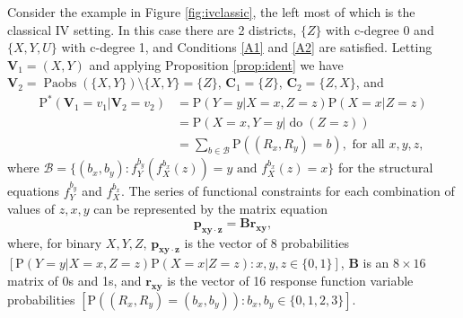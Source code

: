 \documentclass[12pt]{article}
\def\Pr{{\mathrm{P}}}
\def\Pdo{{\mathrm{P}^*}}
\DeclareMathOperator{\Paobs}{Paobs}
\newcommand{\bV}{\boldsymbol{V}}
\DeclareMathOperator{\Do}{do}
\begin{document}
Consider the example in Figure \ref{fig:ivclassic}, the left most of which is the classical IV setting. In this case there are 2 districts, $\{Z\}$ with c-degree 0 and $\{X, Y, U\}$ with c-degree 1, and Conditions \ref{A1} and \ref{A2} are satisfied. Letting $\bV_1 = (X, Y)$ and applying Proposition \ref{prop:ident} we have $\bV_2 = \Paobs(\{X, Y\}) \setminus \{X, Y\} = \{Z\}$, $\boldsymbol{C}_1 = \{Z\}$, $\boldsymbol{C}_2 = \{Z, X\}$, and
\begin{align*}
    \Pdo(\bV_1 = v_{1} |\bV_2 = v_2) &= \Pr(Y = y | X = x, Z = z) \Pr(X = x | Z = z)\\ 
    & = \Pr(X = x, Y = y | \Do(Z = z)) \\
    & = \sum_{b \in \mathcal{B}} \Pr((R_x, R_y) = b), \mbox{ for all } x, y, z,
\end{align*}
where $\mathcal{B} = \{(b_x, b_y): f^{b_y}_Y(f^{b_x}_X(z)) = y \mbox{ and } f^{b_x}_X(z) = x\}$ for the structural equations $f^{b_y}_Y$ and $f^{b_x}_X$. The series of functional constraints for each combination of values of $z, x, y$ can be represented by the matrix equation
\[
\boldsymbol{p_{xy\cdot z}} = \boldsymbol{B} \boldsymbol{r_{xy}}, 
\]
where, for binary $X, Y, Z$, $\boldsymbol{p_{xy\cdot z}}$ is the vector of 8 probabilities $[\Pr(Y = y | X = x, Z = z) \Pr(X = x | Z = z): x, y, z \in \{0, 1\}]$, $\boldsymbol{B}$ is an $8 \times 16$ matrix of 0s and 1s, and $\boldsymbol{r_{xy}}$ is the vector of 16 response function variable probabilities $[\Pr((R_x, R_y) = (b_x, b_y)): b_x, b_y \in \{0, 1, 2, 3\}]$.
\end{document}
